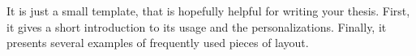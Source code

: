 \documentclass[\myrootdir/main.tex]{subfiles}
\begin{document}
\chapter*{\myAbstractTitle}

It is just a small template, that is hopefully helpful for writing your thesis.
First, it gives a short introduction to its usage and the personalizations.
Finally, it presents several examples of frequently used pieces of layout.
\end{document}
